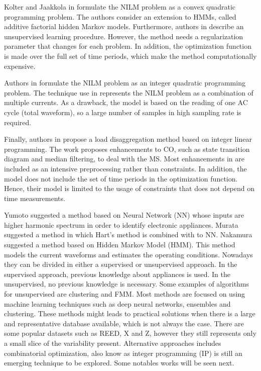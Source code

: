 Kolter and Jaakkola in \cite{afhmm} formulate the NILM problem as a convex quadratic programming problem. The authors consider an extension to HMMs, called additive factorial hidden Markov models. Furthermore, authors in \cite{afhmm} describe an unsupervised learning procedure. However, the method needs a regularization parameter that changes for each problem. In addition, the optimization function is made over the full set of time periods, which make the method computationally expensive.


Authors in \cite{suzuki} formulate the NILM problem as an integer quadratic programming problem. The technique use in \cite{suzuki} represents the NILM problem as a combination of multiple currents. As a drawback, the model is based on the reading of one AC cycle (total waveform), so a large number of samples in high sampling rate is required.

Finally, authors in \cite{bhotto2016} propose a load disaggregation method based on integer linear programming. The work proposes enhancements to CO, such as state transition diagram and median filtering, to deal with the MS. Most enhancements in \cite{bhotto2016} are included as an intensive preprocessing rather than constraints. In addition, the model does not include the set of time periods in the optimization function. Hence, their model is limited to the usage of constraints that does not depend on time measurements.



 Yumoto suggested a method based on Neural Network (NN) whose inputs are higher harmonic spectrum in order to identify electronic appliances. Murata suggested a method in which Hart's method is combined with to NN. Nakamura suggested a method based on Hidden Markov Model (HMM). This method models the current waveforms and estimates the operating conditions. Nowadays they can be divided in either a supervised or unsupervised approach. In the supervised approach, previous knowledge about appliances is used. In the unsupervised, no previous knowledge is necessary. Some examples of algorithms for unsupervised are clustering and FMM. Most methods are focused on using machine learning techniques such as deep neural networks, ensembles and clustering. These methods might leads to practical solutions when there is a large and representative database available, which is not always the case. There are some popular datasets such as REED, X and Z, however they still represents only a small slice of the variability present. Alternative approaches includes combinatorial optimization, also know as integer programming (IP) is still an emerging technique to be explored. Some notables works will be seen next. 

